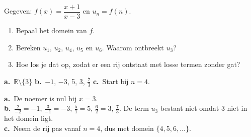 

\begin{oefeningen}
\begin{oefening}[2]
 Gegeven: $f(x) = \dfrac{x+1}{x-3}$ en $u_n = f(n)$.
\begin{enumerate}
  \item Bepaal het domein van $f$.
  \item Bereken $u_1$, $u_2$, $u_4$, $u_5$ en $u_6$. Waarom ontbreekt $u_3$?
  \item Hoe los je dat op, zodat er een rij ontstaat met losse termen zonder gat?
\end{enumerate}
\begin{solution}
\textbf{a.}~$\mathbb{R}\setminus\{3\}$ \quad \textbf{b.}~$-1$, $-3$, 5, 3, $\tfrac73$ \quad \textbf{c.}~Start bij $n=4$.
\end{solution}
\begin{fullsolution}
\textbf{a.}~De noemer is nul bij $x=3$.\\
\textbf{b.}~$\tfrac{2}{-2}=-1$, $\tfrac{3}{-1}=-3$, $\tfrac51=5$, $\tfrac62=3$, $\tfrac73$. De term $u_3$ bestaat niet omdat 3 niet in het domein ligt.\\
\textbf{c.}~Neem de rij pas vanaf $n=4$, dus met domein $\{4,5,6,\ldots\}$.
\end{fullsolution}
\end{oefening}


\end{oefeningen}
